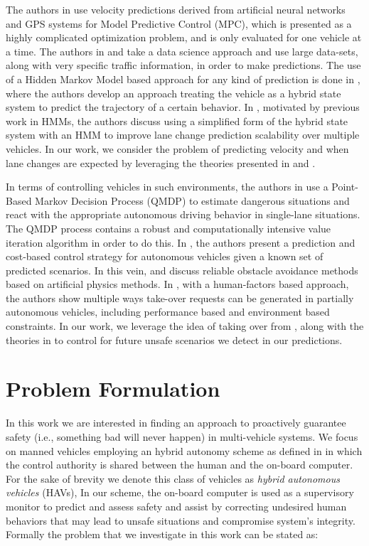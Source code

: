 \documentclass[letterpaper, 10 pt, conference]{ieeeconf}  %
\begin{document}
The authors in \cite{mpc} use velocity predictions derived from artificial neural networks and GPS systems for Model Predictive Control (MPC), which is presented as a highly complicated optimization problem, and is only evaluated for one vehicle at a time. The authors in \cite{velnn} and \cite{veldatadriv} take a data science approach and use large data-sets, along with very specific traffic information, in order to make predictions. The use of a Hidden Markov Model based approach for any kind of prediction is done in \cite{lanhmm}, where the authors develop an approach treating the vehicle as a hybrid state system to predict the trajectory of a certain behavior. In \cite{woohmm}, motivated by previous work in HMMs, the authors discuss using a simplified form of the hybrid state system with an HMM to improve lane change prediction scalability over multiple vehicles. In our work, we consider the problem of predicting velocity and when lane changes are expected by leveraging the theories presented in \cite{mpc} and \cite{woohmm}. 

In terms of controlling vehicles in such environments, the authors in \cite{qmdp} use a Point-Based Markov Decision Process (QMDP) to estimate dangerous situations and react with the appropriate autonomous driving behavior in single-lane situations. The QMDP process contains a robust and computationally intensive value iteration algorithm in order to do this. In \cite{predcost}, the authors present a prediction and cost-based control strategy for autonomous vehicles given a known set of predicted scenarios. In this vein, \cite{vfh+} and \cite{vfh*} discuss reliable obstacle avoidance methods based on artificial physics methods. In \cite{takeover}, with a human-factors based approach, the authors show multiple ways take-over requests can be generated in partially autonomous vehicles, including performance based and environment based constraints. In our work, we leverage the idea of taking over from \cite{takeover}, along with the theories in \cite{vfh*} to control for future unsafe scenarios we detect in our predictions.
    
\section{Problem Formulation} \label{sec:probform}
 
In this work we are interested in finding an approach to proactively guarantee safety (i.e., something bad will never happen) in multi-vehicle systems. We focus on manned vehicles employing an hybrid autonomy scheme as defined in \cite{} in which the control authority is shared between the human and the on-board computer. For the sake of brevity we denote this class of vehicles as {\em hybrid autonomous vehicles} (HAVs), In our scheme, the on-board computer is used as a supervisory monitor to predict and assess safety and assist by correcting undesired human behaviors that may lead to unsafe situations and compromise system's integrity. 
Formally the problem that we investigate in this work can be stated as: 
\end{document}
